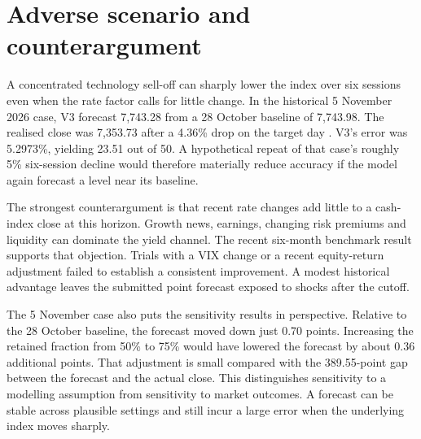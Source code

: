 \documentclass[11pt,a4paper]{article}
\begin{document}
\section{Adverse scenario and counterargument}
A concentrated technology sell-off can sharply lower the index over six sessions even when the rate factor calls for little change. In the historical 5 November 2026 case, V3 forecast 7,743.28 from a 28 October baseline of 7,743.98. The realised close was 7,353.73 after a 4.36\% drop on the target day \cite{apnov5}. V3's error was 5.2973\%, yielding 23.51 out of 50. A hypothetical repeat of that case's roughly 5\% six-session decline would therefore materially reduce accuracy if the model again forecast a level near its baseline.

The strongest counterargument is that recent rate changes add little to a cash-index close at this horizon. Growth news, earnings, changing risk premiums and liquidity can dominate the yield channel. The recent six-month benchmark result supports that objection. Trials with a VIX change or a recent equity-return adjustment failed to establish a consistent improvement. A modest historical advantage leaves the submitted point forecast exposed to shocks after the cutoff.

The 5 November case also puts the sensitivity results in perspective. Relative to the 28 October baseline, the forecast moved down just 0.70 points. Increasing the retained fraction from 50\% to 75\% would have lowered the forecast by about 0.36 additional points. That adjustment is small compared with the 389.55-point gap between the forecast and the actual close. This distinguishes sensitivity to a modelling assumption from sensitivity to market outcomes. A forecast can be stable across plausible settings and still incur a large error when the underlying index moves sharply.
\end{document}
